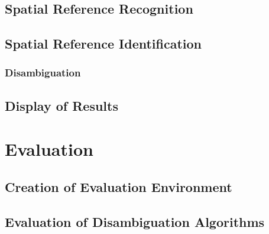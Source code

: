\documentclass[12pt, a4paper]{report}
\begin{document}
\section{Spatial Reference Recognition}




\section{Spatial Reference Identification}


\subsection{Disambiguation}


\section{Display of Results}



\chapter{Evaluation}

\section{Creation of Evaluation Environment}

\section{Evaluation of Disambiguation Algorithms}
\end{document}
